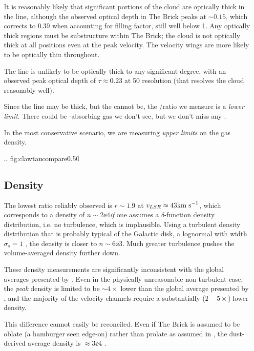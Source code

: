 It is reasonably likely that significant portions of the cloud are optically
thick in the \oneone line, although the observed optical depth in The Brick
peaks at $\sim 0.15$, which corrects to $0.39$ when accounting for filling
factor, still well below 1.  Any optically thick regions must be substructure
within The Brick; the cloud is not optically thick at all positions even at the
peak velocity.  The velocity wings are more likely to be optically thin
throughout.

The \twotwo line is unlikely to be optically thick to any significant degree,
with an observed peak optical depth of $\tau\approx0.23$ at 50 \arcsec
resolution (that resolves the cloud reasonably well).

Since the \oneone line may be thick, but the \twotwo cannot be, the
\oneone/\twotwo ratio we measure is a \emph{lower limit}.  There could be
\oneone-absorbing gas we don't see, but we don't miss any \twotwo.

In the most conservative scenario, we are measuring \emph{upper limits} on the
gas density.

{..}
{fig:clawtaucompare}{0.5}{0}

\subsection{Density}
The lowest ratio reliably observed is $r\sim1.9$ at $v_{LSR}\approx 43 \textrm{km~s}^{-1}$,
which corresponds to a density of $n\sim2\ee{4}$\percc \emph{if} one assumes a
$\delta$-function density distribution, i.e. no turbulence, which is
implausible.  Using a turbulent density distribution that is probably typical
of the Galactic disk, a lognormal with width $\sigma_{s} = 1$
\citep{Ginsburg2013a,Federrath2010a}, the density is closer to $n\sim
6\ee{3}$\percc.  Much greater turbulence pushes the volume-averaged density
further down.

These density measurements are significantly inconsistent with the global
averages presented by \citet{Longmore2012b}.  Even in the physically
unreasonable non-turbulent case, the \emph{peak} \formaldehyde density is
limited to be $\sim4\times$ lower than the global average presented by
\citet{Longmore2012b}, and the majority of the \formaldehyde velocity channels
require a substantially ($2-5\times$) lower density.

This difference cannot easily be reconciled.  Even if The Brick is assumed to
be oblate (a hamburger seen edge-on) rather than prolate as assumed in
\citet{Longmore2012b}, the dust-derived average density is $\approx3\ee{4}$
\percc.


